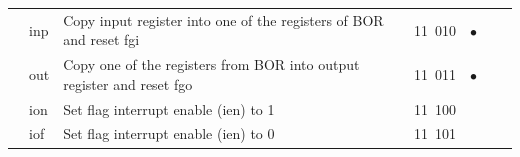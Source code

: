 \begin{table}
\begin{center}
\begin{tabular}{cllcccc}
&inp & Copy input register into one of the registers of  BOR and reset fgi & 11\ 010 & $\bullet$ &&\\


&out &Copy one of the registers from BOR into output  register and  reset fgo & 11\ 011 & $\bullet$ &&\\


& ion &Set flag interrupt enable (ien) to 1 & 11\ 100 &&&\\


& iof &Set flag interrupt enable (ien)  to 0     &11\ 101 & &&\\


\hline


\end{tabular}


\end{center}


\vspace*{15pt}


\end{table}





